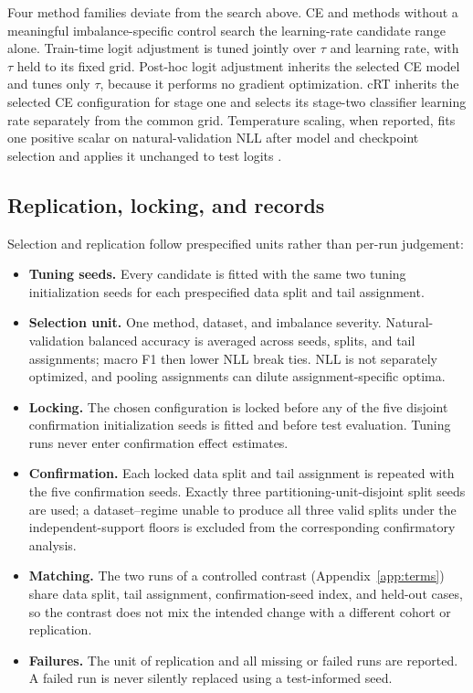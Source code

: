 \documentclass[11pt]{article}
\begin{document}
Four method families deviate from the search above. CE and methods without a meaningful imbalance-specific control search the learning-rate candidate range alone. Train-time logit adjustment is tuned jointly over $\tau$ and learning rate, with $\tau$ held to its fixed grid. Post-hoc logit adjustment inherits the selected CE model and tunes only $\tau$, because it performs no gradient optimization. cRT inherits the selected CE configuration for stage one and selects its stage-two classifier learning rate separately from the common grid. Temperature scaling, when reported, fits one positive scalar on natural-validation NLL after model and checkpoint selection and applies it unchanged to test logits \citep{guo2017calibration}.

\subsection{Replication, locking, and records}
Selection and replication follow prespecified units rather than per-run judgement:
\begin{itemize}\setlength{\itemsep}{1pt}
  \item \textbf{Tuning seeds.} Every candidate is fitted with the same two tuning initialization seeds for each prespecified data split and tail assignment.
  \item \textbf{Selection unit.} One method, dataset, and imbalance severity. Natural-validation balanced accuracy is averaged across seeds, splits, and tail assignments; macro F1 then lower NLL break ties. NLL is not separately optimized, and pooling assignments can dilute assignment-specific optima.
  \item \textbf{Locking.} The chosen configuration is locked before any of the five disjoint confirmation initialization seeds is fitted and before test evaluation. Tuning runs never enter confirmation effect estimates.
  \item \textbf{Confirmation.} Each locked data split and tail assignment is repeated with the five confirmation seeds. Exactly three partitioning-unit-disjoint split seeds are used; a dataset--regime unable to produce all three valid splits under the independent-support floors is excluded from the corresponding confirmatory analysis.
  \item \textbf{Matching.} The two runs of a controlled contrast (Appendix~\ref{app:terms}) share data split, tail assignment, confirmation-seed index, and held-out cases, so the contrast does not mix the intended change with a different cohort or replication.
  \item \textbf{Failures.} The unit of replication and all missing or failed runs are reported. A failed run is never silently replaced using a test-informed seed.
\end{itemize}
\end{document}
